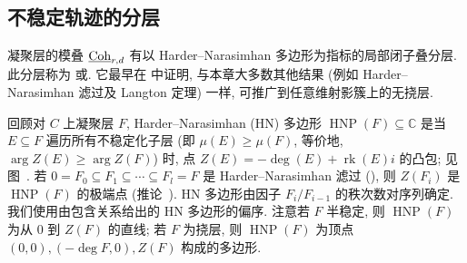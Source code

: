 \subsection{不稳定轨迹的分层}\label{src:9.3.3-subsection}
凝聚层的模叠 $\underline{\mathrm{Coh}}_{r,d}$ 有以 Harder--Narasimhan 多边形为指标的局部闭子叠分层. 此分层称为 或. 它最早在 \cite{Sha77} 中证明, 与本章大多数其他结果 (例如 Harder--Narasimhan 滤过及 Langton 定理) 一样, 可推广到任意维射影簇上的无挠层.

回顾对 $C$ 上凝聚层 $F$, Harder--Narasimhan (HN) 多边形 $\operatorname{HNP}(F)\subseteq\mathbb C$ 是当 $E\subseteq F$ 遍历所有不稳定化子层 (即 $\mu(E)\geq\mu(F)$, 等价地, $\arg Z(E)\geq\arg Z(F)$) 时, 点 $Z(E)=-\deg(E)+\operatorname{rk}(E)i$ 的凸包; 见图~. 若 $0=F_0\subseteq F_1\subseteq\cdots\subseteq F_l=F$ 是 Harder--Narasimhan 滤过 (), 则 $Z(F_i)$ 是 $\operatorname{HNP}(F)$ 的极端点 (推论~). HN 多边形由因子 $F_i/F_{i-1}$ 的秩次数对序列确定. 我们使用由包含关系给出的 HN 多边形的偏序. 注意若 $F$ 半稳定, 则 $\operatorname{HNP}(F)$ 为从 $0$ 到 $Z(F)$ 的直线; 若 $F$ 为挠层, 则 $\operatorname{HNP}(F)$ 为顶点 $(0,0),(-\deg F,0),Z(F)$ 构成的多边形.
